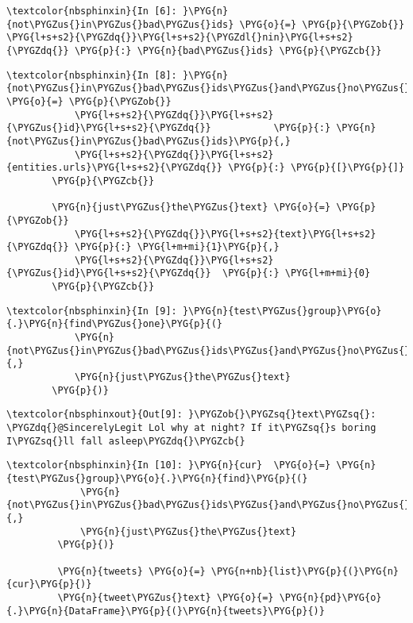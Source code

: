 \documentclass[letterpaper,10pt,english]{sphinxmanual}
\begin{document}
%
\begin{Verbatim}[commandchars=\\\{\}]
\textcolor{nbsphinxin}{In [6]: }\PYG{n}{not\PYGZus{}in\PYGZus{}bad\PYGZus{}ids} \PYG{o}{=} \PYG{p}{\PYGZob{}} \PYG{l+s+s2}{\PYGZdq{}}\PYG{l+s+s2}{\PYGZdl{}nin}\PYG{l+s+s2}{\PYGZdq{}} \PYG{p}{:} \PYG{n}{bad\PYGZus{}ids} \PYG{p}{\PYGZcb{}}
\end{Verbatim}

%
\begin{Verbatim}[commandchars=\\\{\}]
\textcolor{nbsphinxin}{In [8]: }\PYG{n}{not\PYGZus{}in\PYGZus{}bad\PYGZus{}ids\PYGZus{}and\PYGZus{}no\PYGZus{}url} \PYG{o}{=} \PYG{p}{\PYGZob{}}
            \PYG{l+s+s2}{\PYGZdq{}}\PYG{l+s+s2}{\PYGZus{}id}\PYG{l+s+s2}{\PYGZdq{}}           \PYG{p}{:} \PYG{n}{not\PYGZus{}in\PYGZus{}bad\PYGZus{}ids}\PYG{p}{,}
            \PYG{l+s+s2}{\PYGZdq{}}\PYG{l+s+s2}{entities.urls}\PYG{l+s+s2}{\PYGZdq{}} \PYG{p}{:} \PYG{p}{[}\PYG{p}{]}
        \PYG{p}{\PYGZcb{}}
        
        \PYG{n}{just\PYGZus{}the\PYGZus{}text} \PYG{o}{=} \PYG{p}{\PYGZob{}}
            \PYG{l+s+s2}{\PYGZdq{}}\PYG{l+s+s2}{text}\PYG{l+s+s2}{\PYGZdq{}} \PYG{p}{:} \PYG{l+m+mi}{1}\PYG{p}{,}
            \PYG{l+s+s2}{\PYGZdq{}}\PYG{l+s+s2}{\PYGZus{}id}\PYG{l+s+s2}{\PYGZdq{}}  \PYG{p}{:} \PYG{l+m+mi}{0}
        \PYG{p}{\PYGZcb{}}
\end{Verbatim}

%
\begin{Verbatim}[commandchars=\\\{\}]
\textcolor{nbsphinxin}{In [9]: }\PYG{n}{test\PYGZus{}group}\PYG{o}{.}\PYG{n}{find\PYGZus{}one}\PYG{p}{(}
            \PYG{n}{not\PYGZus{}in\PYGZus{}bad\PYGZus{}ids\PYGZus{}and\PYGZus{}no\PYGZus{}url}\PYG{p}{,}
            \PYG{n}{just\PYGZus{}the\PYGZus{}text}
        \PYG{p}{)}
\end{Verbatim}

%
\begin{Verbatim}[commandchars=\\\{\}]
\textcolor{nbsphinxout}{Out[9]: }\PYGZob{}\PYGZsq{}text\PYGZsq{}: \PYGZdq{}@SincerelyLegit Lol why at night? If it\PYGZsq{}s boring I\PYGZsq{}ll fall asleep\PYGZdq{}\PYGZcb{}
\end{Verbatim}

%
\begin{Verbatim}[commandchars=\\\{\}]
\textcolor{nbsphinxin}{In [10]: }\PYG{n}{cur}  \PYG{o}{=} \PYG{n}{test\PYGZus{}group}\PYG{o}{.}\PYG{n}{find}\PYG{p}{(}
             \PYG{n}{not\PYGZus{}in\PYGZus{}bad\PYGZus{}ids\PYGZus{}and\PYGZus{}no\PYGZus{}url}\PYG{p}{,}
             \PYG{n}{just\PYGZus{}the\PYGZus{}text}
         \PYG{p}{)}
         
         \PYG{n}{tweets} \PYG{o}{=} \PYG{n+nb}{list}\PYG{p}{(}\PYG{n}{cur}\PYG{p}{)}
         \PYG{n}{tweet\PYGZus{}text} \PYG{o}{=} \PYG{n}{pd}\PYG{o}{.}\PYG{n}{DataFrame}\PYG{p}{(}\PYG{n}{tweets}\PYG{p}{)}
\end{Verbatim}
\end{document}
